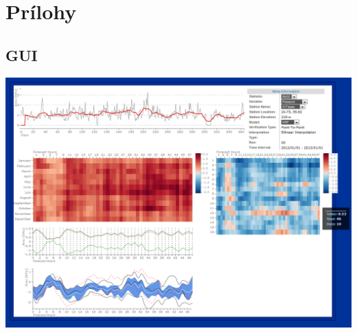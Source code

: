 \appendix
\chapter{Prílohy}

\section{GUI}
{ \hspace*{-1in}
\includegraphics[width=7.5in]{gui} %
}


